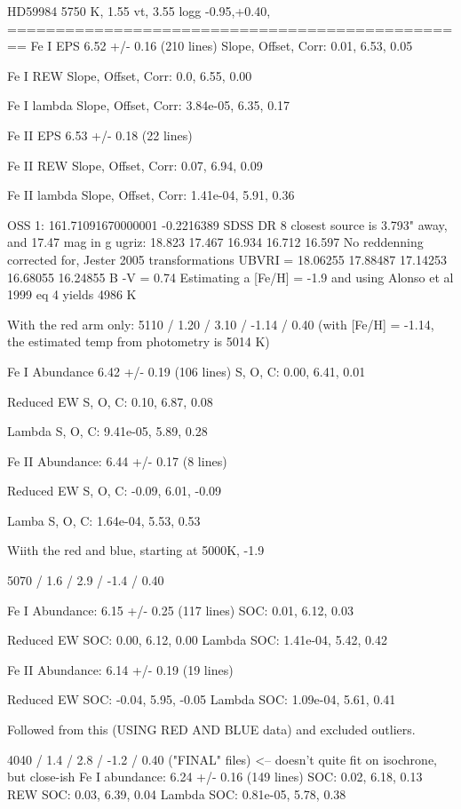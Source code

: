 \documentclass{emulateapj}
\begin{document}
HD59984 5750 K, 1.55 vt, 3.55 logg -0.95,+0.40,
================================================
Fe I EPS 6.52 +/- 0.16 (210 lines)
Slope, Offset, Corr: 0.01, 6.53, 0.05

Fe I REW
Slope, Offset, Corr: 0.0, 6.55, 0.00

Fe I lambda
Slope, Offset, Corr: 3.84e-05, 6.35, 0.17

Fe II EPS 6.53 +/- 0.18 (22 lines)

Fe II REW
Slope, Offset, Corr: 0.07, 6.94, 0.09

Fe II lambda
Slope, Offset, Corr: 1.41e-04, 5.91, 0.36


OSS 1:
161.71091670000001 -0.2216389
SDSS DR 8 closest source is 3.793" away, and 17.47 mag in g
ugriz: 18.823 17.467 16.934 16.712 16.597
No reddenning corrected for, Jester 2005 transformations
UBVRI = 18.06255 17.88487 17.14253 16.68055 16.24855
B -V = 0.74
Estimating a [Fe/H] = -1.9 and using Alonso et al 1999 eq 4 yields 4986 K

With the red arm only:
5110 / 1.20 / 3.10 / -1.14 / 0.40
(with [Fe/H] = -1.14, the estimated temp from photometry is 5014 K)

Fe I Abundance 6.42 +/- 0.19 (106 lines)
S, O, C: 0.00, 6.41, 0.01

Reduced EW S, O, C: 0.10, 6.87, 0.08

Lambda S, O, C: 9.41e-05, 5.89, 0.28

Fe II Abundance: 6.44 +/- 0.17 (8 lines)

Reduced EW S, O, C: -0.09, 6.01, -0.09

Lamba S, O, C: 1.64e-04, 5.53, 0.53

Wiith the red and blue, starting at 5000K, -1.9

5070 / 1.6 / 2.9 / -1.4 / 0.40

Fe I Abundance: 6.15 +/- 0.25 (117 lines)
SOC: 0.01, 6.12, 0.03

Reduced EW SOC: 0.00, 6.12, 0.00
Lambda SOC: 1.41e-04, 5.42, 0.42

Fe II Abundance: 6.14 +/- 0.19 (19 lines)

Reduced EW SOC: -0.04, 5.95, -0.05
Lambda SOC: 1.09e-04, 5.61, 0.41

Followed from this (USING RED AND BLUE data) and excluded outliers.

4040 / 1.4 / 2.8 / -1.2 / 0.40 ("FINAL" files) <-- doesn't quite fit on isochrone, but close-ish
Fe I abundance: 6.24 +/- 0.16 (149 lines)
SOC: 0.02, 6.18, 0.13
REW SOC: 0.03, 6.39, 0.04
Lambda SOC: 0.81e-05, 5.78, 0.38
\end{document}
